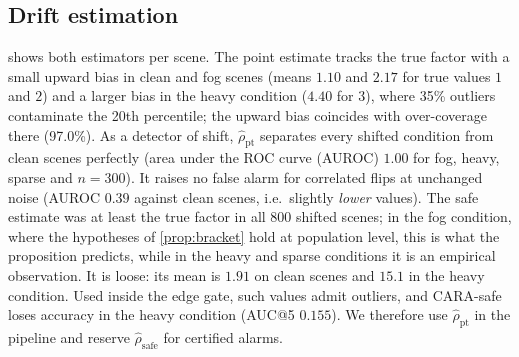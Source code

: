 \subsection{Drift estimation}\label{sec:drift}
 shows both estimators per scene. The point estimate tracks the true factor with a small upward bias in clean and fog scenes (means $1.10$ and $2.17$ for true values $1$ and $2$) and a larger bias in the heavy condition ($4.40$ for $3$), where 35\% outliers contaminate the 20th percentile; the upward bias coincides with over-coverage there (97.0\%). As a detector of shift, $\hat\rho_{\mathrm{pt}}$ separates every shifted condition from clean scenes perfectly (area under the ROC curve (AUROC) $1.00$ for fog, heavy, sparse and $n=300$). It raises no false alarm for correlated flips at unchanged noise (AUROC $0.39$ against clean scenes, i.e.\ slightly \emph{lower} values). The safe estimate was at least the true factor in all 800 shifted scenes; in the fog condition, where the hypotheses of \cref{prop:bracket} hold at population level, this is what the proposition predicts, while in the heavy and sparse conditions it is an empirical observation. It is loose: its mean is $1.91$ on clean scenes and $15.1$ in the heavy condition. Used inside the edge gate, such values admit outliers, and CARA-safe loses accuracy in the heavy condition (AUC@5 $0.155$). We therefore use $\hat\rho_{\mathrm{pt}}$ in the pipeline and reserve $\hat\rho_{\mathrm{safe}}$ for certified alarms.


